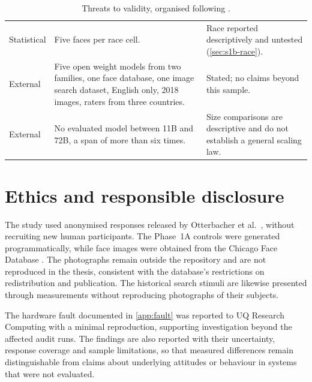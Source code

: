 \begin{table}[htbp]
\begin{tabularx}{\linewidth}{@{}lXX@{}}
Statistical & Five faces per race cell. & Race reported descriptively and
untested (\cref{sec:s1b-race}). \\
External & Five open weight models from two families, one face database, one
image search dataset, English only, 2018 images, raters from three countries.
& Stated; no claims beyond this sample. \\
External & No evaluated model between 11B and 72B, a span of more than six times. &
Size comparisons are descriptive and do not establish a general scaling law. \\
\bottomrule
\end{tabularx}
\caption{Threats to validity, organised following \cite{messick1995validity}.}
\label{tab:threats}
\end{table}


\section{Ethics and responsible disclosure}\label{sec:disc-ethics}

The study used anonymised responses released by Otterbacher et al.\
\cite{otterbacher2018sigir}, without recruiting new human participants.
The Phase~1A controls were generated programmatically, while face images
were obtained from the Chicago Face Database \cite{ma2015cfd}.
The photographs remain outside the repository and are not reproduced in the
thesis, consistent with the database's restrictions on redistribution and
publication. The historical search stimuli are likewise presented through
measurements without reproducing photographs of their subjects.

The hardware fault documented in \cref{app:fault} was reported to UQ Research
Computing with a minimal reproduction, supporting investigation beyond the
affected audit runs. The findings are also reported with their uncertainty,
response coverage and sample limitations, so that measured differences remain
distinguishable from claims about underlying attitudes or behaviour in
systems that were not evaluated.
